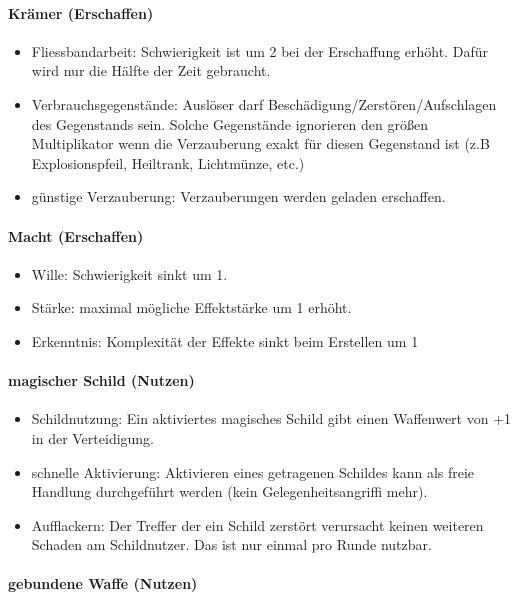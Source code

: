 \documentclass{article}
\begin{document}
\paragraph{Krämer (Erschaffen)}

\begin{itemize}
\item Fliessbandarbeit: Schwierigkeit ist um 2 bei der Erschaffung erhöht. Dafür wird nur die Hälfte der Zeit gebraucht.
\item Verbrauchsgegenstände: Auslöser darf Beschädigung/Zerstören/Aufschlagen des Gegenstands sein. Solche Gegenstände ignorieren den größen Multiplikator wenn die Verzauberung exakt für diesen Gegenstand ist (z.B Explosionspfeil, Heiltrank, Lichtmünze, etc.)
\item günstige Verzauberung: Verzauberungen werden geladen erschaffen.
\end{itemize}

\paragraph{Macht (Erschaffen)}

\begin{itemize}
\item Wille: Schwierigkeit sinkt um 1.
\item Stärke: maximal mögliche Effektstärke um 1 erhöht.
\item Erkenntnis: Komplexität der Effekte sinkt beim Erstellen um 1
\end{itemize}

\paragraph{magischer Schild (Nutzen)}

\begin{itemize}
\item Schildnutzung: Ein aktiviertes magisches Schild gibt einen Waffenwert von +1 in der Verteidigung.
\item schnelle Aktivierung: Aktivieren eines getragenen Schildes kann als freie Handlung durchgeführt werden (kein Gelegenheitsangriffi mehr).
\item Aufflackern: Der Treffer der ein Schild zerstört verursacht keinen weiteren Schaden am Schildnutzer. Das ist nur einmal pro Runde nutzbar.
\end{itemize}

\paragraph{gebundene Waffe (Nutzen)}
\end{document}
